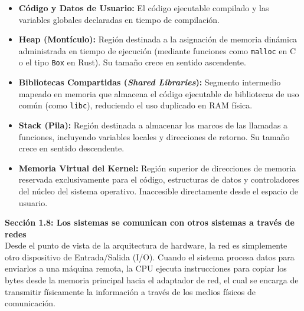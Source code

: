 \documentclass[11pt, a4paper]{article}
\begin{document}
\begin{itemize}
  \begin{itemize}
    \item \textbf{Código y Datos de Usuario:} El código ejecutable compilado y las variables globales declaradas en tiempo de compilación.
    \item \textbf{Heap (Montículo):} Región destinada a la asignación de memoria dinámica administrada en tiempo de ejecución (mediante funciones como \texttt{malloc} en C o el tipo \texttt{Box} en Rust). Su tamaño crece en sentido ascendente.
    \item \textbf{Bibliotecas Compartidas (\textit{Shared Libraries}):} Segmento intermedio mapeado en memoria que almacena el código ejecutable de bibliotecas de uso común (como \texttt{libc}), reduciendo el uso duplicado en RAM física.
    \item \textbf{Stack (Pila):} Región destinada a almacenar los marcos de las llamadas a funciones, incluyendo variables locales y direcciones de retorno. Su tamaño crece en sentido descendente.
    \item \textbf{Memoria Virtual del Kernel:} Región superior de direcciones de memoria reservada exclusivamente para el código, estructuras de datos y controladores del núcleo del sistema operativo. Inaccesible directamente desde el espacio de usuario.
  \end{itemize}
\end{itemize}

\noindent\textbf{Sección 1.8: Los sistemas se comunican con otros sistemas a través de redes}\\[0.5em]
Desde el punto de vista de la arquitectura de hardware, la red es simplemente otro dispositivo de Entrada/Salida (I/O). Cuando el sistema procesa datos para enviarlos a una máquina remota, la CPU ejecuta instrucciones para copiar los bytes desde la memoria principal hacia el adaptador de red, el cual se encarga de transmitir físicamente la información a través de los medios físicos de comunicación.
\end{document}
